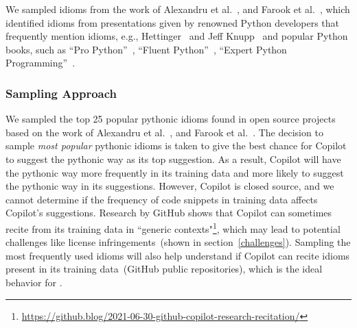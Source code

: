 We sampled idioms from the work of Alexandru et al.~\cite{Alexandru2018}, and Farook et al.~\cite{idioms}, which identified idioms from presentations given by renowned Python developers that frequently mention idioms, e.g., Hettinger~\cite{hettinger} and Jeff Knupp~\cite{knupp} and 
popular Python books, such as ``Pro Python''~\cite{Alchin2010}, ``Fluent Python''~\cite{fluent}, ``Expert Python Programming''~\cite{expert}.


\subsubsection{Sampling Approach}
\label{sampling}
We sampled the top 25 popular pythonic idioms found in open source projects based on the work of Alexandru et al.~\cite{Alexandru2018}, and Farook et al.~\cite{idioms}.
The decision to sample \emph{most popular} pythonic idioms is taken to give the best chance for Copilot to suggest the pythonic way as its top suggestion. As a result, Copilot will have the pythonic way more frequently in its training data and more likely to suggest the pythonic way in its suggestions.
However, Copilot is closed source, and we cannot determine if the frequency of code snippets in training data affects Copilot's suggestions. Research by GitHub shows that Copilot can sometimes recite from its training data in ``generic contexts"\footnote{\url{https://github.blog/2021-06-30-github-copilot-research-recitation/}}, which may lead to potential challenges like license infringements~(shown in section~\ref{challenges}). 
Sampling the most frequently used idioms will also help understand if Copilot can recite idioms present in its training data~(GitHub public repositories), which is the ideal behavior for \cct{}.
